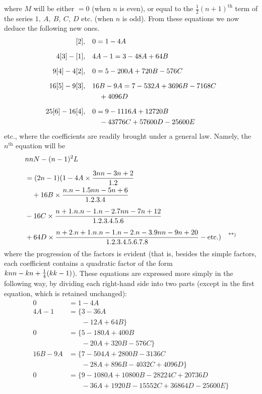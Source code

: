 where \(M\) will be either \(=0\) (when \(n\) is even), or equal to the \(\frac12(n+1)^{\mathrm{th}}\) term of the series
\(1,\ A,\ B,\ C,\ D\) etc. (when \(n\) is odd). From these equations we now deduce the following new ones.
\[
\begin{aligned}
\relax [2],\quad&0=1-4A\\[6pt]
4[3]-[1],\quad&4A-1=3-48A+64B\\[6pt]
9[4]-4[2],\quad&0=5-200A+720B-576C\\[6pt]
16[5]-9[3],\quad&16B-9A=7-532A+3696B-7168C\\&\quad+4096D\\[6pt]
25[6]-16[4],\quad&0=9-1116A+12720B\\&\quad-43776C+57600D-25600E
\end{aligned}
\]
etc., where the coefficients are readily brought under a general law. Namely, the \(n^{\mathrm{th}}\) equation will be
\[
\begin{aligned}
&nnN-(n-1)^2L\\[6pt]&=(2n-1)(1-4A\times\frac{3nn-3n+2}{1.2}
\\&\quad+16B\times\frac{n.n-1.5nn-5n+6}{1.2.3.4}\\[6pt]
&-16C\times\frac{n+1.n.n-1.n-2.7nn-7n+12}{1.2.3.4.5.6}\\[6pt]
&+64D\times\frac{n+2.n+1.n.n-1.n-2.n-3.9nn-9n+20}{1.2.3.4.5.6.7.8}-\text{etc.})\quad\text{\textsuperscript{**)}}
\end{aligned}
\]\begingroup\renewcommand{\thefootnote}{**)}\endgroup
where the progression of the factors is evident (that is, besides the simple factors, each coefficient contains a quadratic factor of the form\hfill\\{}
\(knn-\nobreak{}kn+\nobreak{}\frac14(kk-\nobreak{}1)\)). These equations
are expressed more simply in the following way, by dividing each right-hand side into two
parts (except in the first equation, which is retained unchanged):
\[
\begin{aligned}
0&=1-4A\\[6pt]
4A-1&=\{3-36A\\[6pt]
&\phantom{=\{}-12A+64B\}\\[6pt]
0&=\{5-180A+400B\\[6pt]
&\phantom{=\{}-20A+320B-576C\}\\[6pt]
16B-9A&=\{7-504A+2800B-3136C\\[6pt]
&\phantom{=\{}-28A+896B-4032C+4096D\}\\[6pt]
0&=\{9-1080A+10800B-28224C+20736D\\[6pt]
&\phantom{=\{}-36A+1920B-15552C+36864D-25600E\}
\end{aligned}
\]
